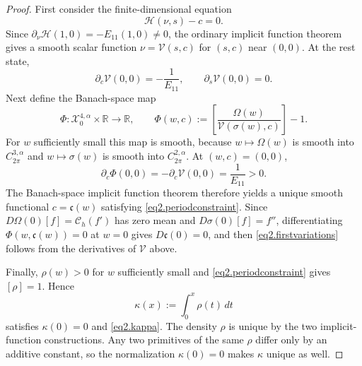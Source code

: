 \documentclass[10pt,a4paper]{amsart}
\begin{document}
\begin{proof}
First consider the finite-dimensional equation
\[
\mathscr H(\nu,s)-c=0.
\]
Since $\partial_\nu\mathscr H(1,0)=-E_{11}(1,0)\neq0$, the ordinary implicit
function theorem gives a smooth scalar function $\nu=\mathcal V(s,c)$ for $(s,c)$
near $(0,0)$.  At the rest state,
\[
\partial_c\mathcal V(0,0)=-\frac1{E_{11}},
\qquad
\partial_s\mathcal V(0,0)=0.
\]
Next define the Banach-space map
\[
\Phi:\mathcal X^{4,\alpha}_0\times\mathbb R\longrightarrow\mathbb R,
\qquad
\Phi(w,c)
:=
\left[\frac{\Omega(w)}{\mathcal V(\sigma(w),c)}\right]-1.
\]
For $w$ sufficiently small this map is smooth, because
$w\mapsto\Omega(w)$ is smooth into $C^{3,\alpha}_{2\pi}$ and
$w\mapsto\sigma(w)$ is smooth into $C^{2,\alpha}_{2\pi}$.  At $(w,c)=(0,0)$,
\[
\partial_c\Phi(0,0)
=-\partial_c\mathcal V(0,0)
=\frac1{E_{11}}>0.
\]
The Banach-space implicit function theorem therefore yields a unique smooth functional
$c=\mathfrak c(w)$ satisfying \eqref{eq2.periodconstraint}.  Since
$D\Omega(0)[f]=\mathcal C_h(f')$ has zero mean and
$D\sigma(0)[f]=f''$, differentiating $\Phi(w,\mathfrak c(w))=0$ at $w=0$ gives
$D\mathfrak c(0)=0$, and then \eqref{eq2.firstvariations} follows from the derivatives
of $\mathcal V$ above.

Finally, $\rho(w)>0$ for $w$ sufficiently small and \eqref{eq2.periodconstraint} gives
$[\rho]=1$.  Hence
\[
\kappa(x):=\int_0^x\rho(t)\,dt
\]
satisfies $\kappa(0)=0$ and \eqref{eq2.kappa}.  The density $\rho$ is unique by the two
implicit-function constructions.  Any two primitives of the same $\rho$ differ only by an
additive constant, so the normalization $\kappa(0)=0$ makes $\kappa$ unique as well.
\end{proof}
\end{document}
